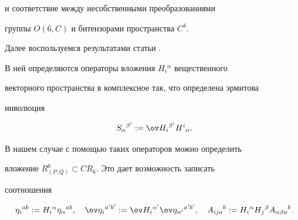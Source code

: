 и соответствие между несобственными преобразованиями


группы $O(6,C)$ и битензорами пространства $C^4$.





Далее воспользуемся результатами статьи \cite{Neif1}.


В ней определяются операторы вложения $H_i{}^\alpha$ вещественного


векторного пространства в комплексное так, что определена эрмитова


инволюция


\begin{equation}


\label{e24av}


S_\alpha{}^{\beta '}:=\ov H_i{}^{\beta '}H^i{}_\alpha.


\end{equation}


В нашем случае с помощью таких операторов можно определить


вложение $R^6_{(P,Q)}\subset CR_6$. Это дает возможность записать


соотношения


\begin{equation}


\label{e24av1}


\eta_i{}^{ab}:=H_i{}^\alpha\eta_\alpha{}^{ab},\quad


\ov\eta_i{}^{a'b'}:=\ov H_i{}^{\alpha '}\ov \eta_{\alpha '}{}^{a'b'},\quad


A_{ij a}{}^b:=H_i{}^\alpha H_j{}^\beta A_{\alpha\beta a}{}^b.


\end{equation}






